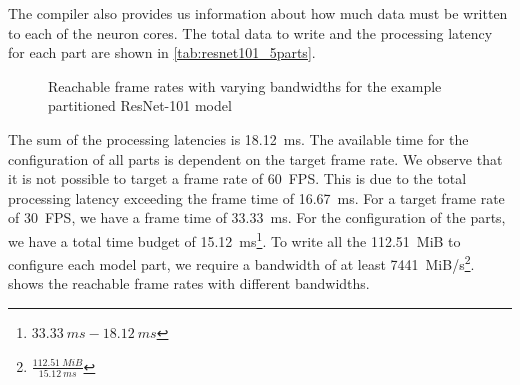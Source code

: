 The compiler also provides us information about how much data must be written to each of the neuron cores.
The total data to write and the processing latency for each part are shown in \cref{tab:resnet101_5parts}.

\begin{figure}[hbtp]
    \centering
    
    \caption{Reachable frame rates with varying bandwidths for the example partitioned ResNet-101 model}
    \label{fig:large_model_bandwidth_analysis_example_resnet101}
\end{figure}

The sum of the processing latencies is \SI{18.12}{ms}.
The available time for the configuration of all parts is dependent on the target frame rate.
We observe that it is not possible to target a frame rate of \SI{60}{FPS}.
This is due to the total processing latency exceeding the frame time of \SI{16.67}{ms}. 
For a target frame rate of \SI{30}{FPS}, we have a frame time of \SI{33.33}{ms}.
For the configuration of the parts, we have a total time budget of \SI{15.12}{ms}\footnote{$\SI{33.33}{ms} - \SI{18.12}{ms}$}.
To write all the \SI{112.51}{MiB} to configure each model part, we require a bandwidth of at least \SI{7441}{MiB/s}\footnote{$\frac{\SI{112.51}{MiB}}{\SI{15.12}{ms}}$}.
 shows the reachable frame rates with different bandwidths.
